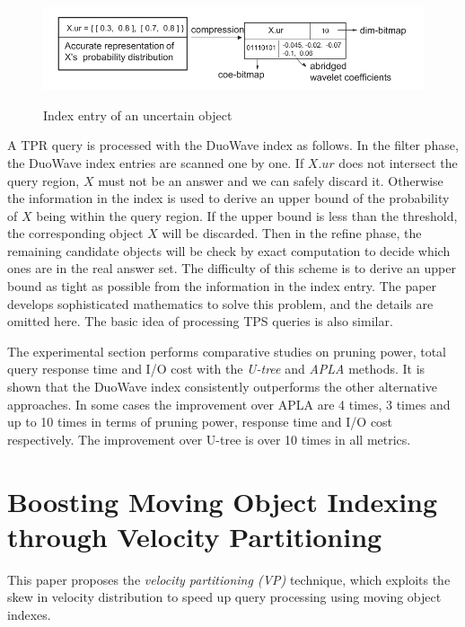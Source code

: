 \documentclass[paper=a4, fontsize=18pt]{article} %
\numberwithin{equation}{section} %
\numberwithin{figure}{section} %
\numberwithin{table}{section} %
\begin{document}
\begin{figure}[h]
  \centering
  \includegraphics[width=.9\linewidth]{7_11_duowave.png}\\
  \caption{Index entry of an uncertain object}\label{fig:duowave_index}
\end{figure}

A TPR query is processed with the DuoWave index as follows. In the filter phase, the DuoWave index entries are scanned one by one. If $X.ur$ does not intersect the query region, $X$ must not be an answer and we can safely discard it. Otherwise the information in the index is used to derive an upper bound of the probability of $X$ being within the query region. If the upper bound is less than the threshold, the corresponding object $X$ will be discarded. Then in the refine phase, the remaining candidate objects will be check by exact computation to decide which ones are in the real answer set. The difficulty of this scheme is to derive an upper bound as tight as possible from the information in the index entry. The paper develops sophisticated mathematics to solve this problem, and the details are omitted here. The basic idea of processing TPS queries is also similar.

The experimental section performs comparative studies on pruning power, total query response time and I/O cost with the \emph{U-tree} \cite{TCXNKP05} and \emph{APLA} \cite{LS07} methods. It is shown that the DuoWave index consistently outperforms the other alternative approaches. In some cases the improvement over APLA are 4 times, 3 times and up to 10 times in terms of pruning power, response time and I/O cost respectively. The improvement over U-tree is over 10 times in all metrics.

\section{Boosting Moving Object Indexing through Velocity Partitioning \cite{NHZW12}}

This paper proposes the \emph{velocity partitioning (VP)} technique, which exploits the skew in velocity distribution to speed up query processing using moving object indexes.
\end{document}
